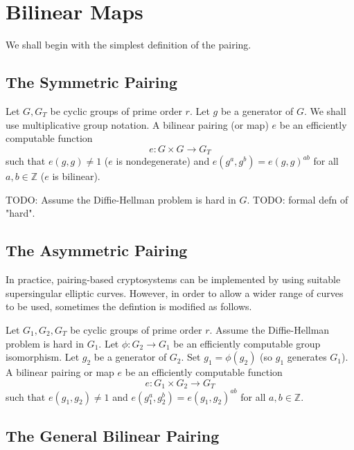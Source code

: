 \chapter{Bilinear Maps}

We shall begin with the simplest definition of the pairing.

\section{The Symmetric Pairing}

Let $G, G_T$ be cyclic groups of prime order $r$.
Let $g$ be a generator of $G$. We shall use multiplicative group
notation.
A bilinear pairing (or map) $e$ be an efficiently computable function
\[
e:G \times G \rightarrow G_T
\]
such that $e(g,g) \ne 1$ ($e$ is nondegenerate) and
$e(g^a, g^b) = e(g,g)^{a b}$ for all $a, b \in \mathbb{Z}$ ($e$ is
bilinear).

TODO: Assume the Diffie-Hellman problem is hard in $G$.
TODO: formal defn of "hard".

\section{The Asymmetric Pairing}

In practice, pairing-based cryptosystems can be implemented
by using suitable supersingular elliptic curves.
However, in order to allow a wider range of curves to be used,
sometimes the defintion is modified as follows.

Let $G_1, G_2, G_T$ be cyclic groups of prime order $r$.
Assume the Diffie-Hellman problem is hard in $G_1$.
Let $\phi : G_2 \rightarrow G_1$ be an efficiently computable group
isomorphism. Let $g_2$ be a generator of $G_2$.
Set $g_1 = \phi(g_2)$ (so $g_1$ generates $G_1$). 
A bilinear pairing or map $e$ be an efficiently computable function
\[
e:G_1 \times G_2 \rightarrow G_T
\]
such that $e(g_1,g_2) \ne 1$ and
$e(g_1^a, g_2^b) = e(g_1,g_2)^{a b}$ for all $a, b \in \mathbb{Z}$.


\section{The General Bilinear Pairing}

